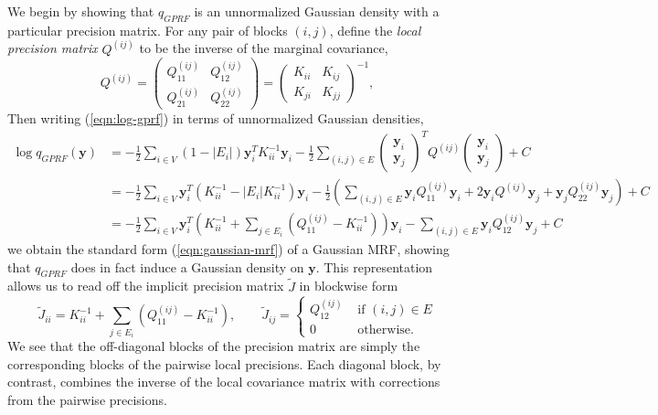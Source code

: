 \documentclass{article}
\renewcommand{\v}[1]{\mathbf{#1}}
\begin{document}
We begin by showing that $q_{GPRF}$ is an unnormalized Gaussian
density with a particular precision matrix. For any pair of blocks $(i,j)$, define the {\em local precision  matrix} $Q^{(ij)}$ to be the inverse of the marginal covariance,
\[Q^{(ij)} = \left(\begin{array}{cc} Q^{(ij)}_{11} &  Q^{(ij)}_{12}\\
  Q^{(ij)}_{21}  & Q^{(ij)}_{22}\end{array}\right) = \left(\begin{array}{cc} K_{ii} &  K_{ij}\\
  K_{ji}  & K_{jj}\end{array}\right)^{-1},\]
Then writing (\ref{eqn:log-gprf}) in terms of unnormalized Gaussian densities,
\begin{align}
\log q_{GPRF}(\v{y}) &= -\frac{1}{2} \sum_{i\in V} (1-|E_i|) \v{y}_i^T
K_{ii}^{-1} \v{y}_i -\frac{1}{2}  \sum_{(i,j)\in E} \left(\begin{array}{c}
      \v{y}_i \\ \v{y}_j\end{array}\right)^T Q^{(ij)}\left(\begin{array}{c}
      \v{y}_i \\
      \v{y}_j\end{array}\right) + C\\
&= -\frac{1}{2}\sum_{i\in V}  \v{y}_i^T \left(K_{ii}^{-1} - |E_i|
  K_{ii}^{-1}\right)\v{y}_i -\frac{1}{2}  \left(\sum_{(i,j)\in E} \v{y}_i
Q^{(ij)}_{11} \v{y}_i + 2\v{y}_i Q^{(ij)}\v{y}_j + \v{y}_jQ^{(ij)}_{22}\v{y}_j\right) + C\\
&= -\frac{1}{2}\sum_{i\in V}  \v{y}_i^T \left(K_{ii}^{-1} + \sum_{j\in E_i}
\left(Q^{(ij)}_{11} - K_{ii}^{-1}\right) \right)\v{y}_i - \sum_{(i,j)\in E}
\v{y}_i Q^{(ij)}_{12} \v{y}_j + C
\end{align}
we obtain the standard form (\ref{eqn:gaussian-mrf}) of a Gaussian
MRF, showing that $q_{GPRF}$ does in fact induce a Gaussian density on
$\v{y}$. This
representation allows us to read off the implicit precision matrix $\tilde{J}$ in blockwise form
\begin{equation}
\tilde{J}_{ii} = K_{ii}^{-1} + \sum_{j\in E_i} \left(Q^{(ij)}_{11}
    - K_{ii}^{-1}\right), \qquad \tilde{J}_{ij} =
  \left\{\begin{array}{ll}Q^{(ij)}_{12} & \text{ if } (i,j) \in E\\0
    & \text{ otherwise.}\end{array}\right.\label{eqn:approx-precision}
\end{equation}
We see that the off-diagonal blocks of the precision matrix are simply
the corresponding blocks of the pairwise local precisions. Each
diagonal block, by contrast, combines the inverse of the local
covariance matrix with corrections from the pairwise
precisions. 
\end{document}

